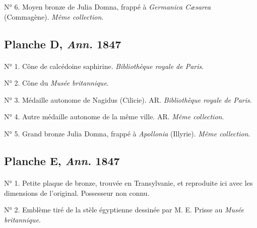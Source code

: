 \documentclass[a4paper, 11pt, oneside, polutonikogreek, french]{article}
\begin{document}
N° 6. Moyen bronze de Julia Domna, frappé à \emph{Germanica Cæsarea} (Commagène). \emph{Même collection}.
\clearpage
\subsection{Planche D, \emph{Ann.} 1847}
\paragraph{}
N° 1. Cône de calcédoine saphirine. \emph{Bibliothèque royale de Paris}.

N° 2. Cône du \emph{Musée britannique}.

N° 3. Médaille autonome de Nagidus (Cilicie). AR. \emph{Bibliothèque royale de Paris}.

N° 4. Autre médaille autonome de la même ville. AR. \emph{Même collection}.

N° 5. Grand bronze Julia Domna, frappé à \emph{Apollonia} (Illyrie). \emph{Même collection}.
\clearpage
\subsection{Planche E, \emph{Ann.} 1847}
\paragraph{}
N° 1. Petite plaque de bronze, trouvée en Transylvanie, et reproduite ici avec les dimensions de l'original. Possesseur non connu.

N° 2. Emblème tiré de la stèle égyptienne dessinée par M. E. Prisse au \emph{Musée britannique}.
\clearpage
\end{document}
